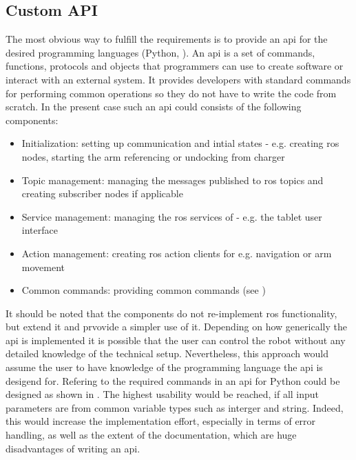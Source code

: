 \subsection{Custom API}
\label{sub:PyApi}
The most obvious way to fulfill the requirements is to provide an \gls{api} for the desired programming languages (Python, \Cpp{}). An \gls{api} is a set of commands, functions, protocols and objects that programmers can use to create software or interact with an external system. It provides developers with standard commands for performing common operations so they do not have to write the code from scratch. In the present case such an \gls{api} could consists of the following components:

\begin{itemize}
	\item Initialization: setting up communication and intial states - e.g. creating \gls{ros} nodes, starting the arm referencing or undocking from charger
	\item Topic management: managing the messages published to \gls{ros} topics and creating subscriber nodes if applicable
	\item Service management: managing the \gls{ros} services of \hobbit{} - e.g. the tablet user interface
	\item Action management: creating \gls{ros} action clients for e.g. navigation or arm movement
	\item Common commands: providing common commands (see )
\end{itemize}

It should be noted that the components do not re-implement \gls{ros} functionality, but extend it and prvovide a simpler use of it. Depending on how generically the \gls{api} is implemented it is possible that the user can control the robot without any detailed knowledge of the technical setup. Nevertheless, this approach would assume the user to have knowledge of the programming language the \gls{api} is desigend for. Refering to the required commands in  an \gls{api} for Python could be designed as shown in . The highest usability would be reached, if all input parameters are from common variable types such as interger and string. Indeed, this would increase the implementation effort, especially in terms of error handling, as well as the extent of the documentation,  which are huge disadvantages of writing an \gls{api}. \\

